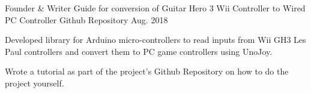 \begin{cventries}
  \cventry
    {Founder \& Writer}
    {Guide for conversion of Guitar Hero 3 Wii Controller to Wired PC Controller}
    {Github Repository}
    {Aug. 2018}
    {
      \begin{cvitems}
        \item {Developed library for Arduino micro-controllers to read inputs from Wii GH3 Les Paul controllers and convert them to PC game controllers using UnoJoy.}
        \item {Wrote a tutorial as part of the project's Github Repository on how to do the project yourself.}
      \end{cvitems}
    }
\end{cventries}
